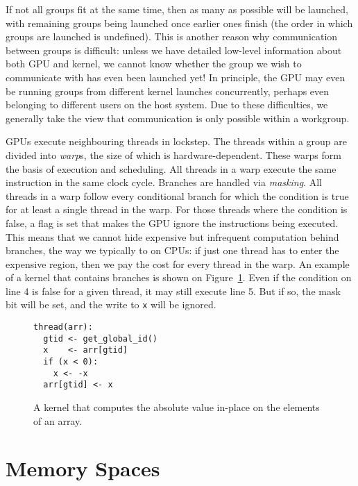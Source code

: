 If not all groups fit at the same time, then as many as possible will
be launched, with remaining groups being launched once earlier ones
finish (the order in which groups are launched is undefined).  This is
another reason why communication between groups is difficult: unless
we have detailed low-level information about both GPU and kernel, we
cannot know whether the group we wish to communicate with has even
been launched yet!  In principle, the GPU may even be running groups
from different kernel launches concurrently, perhaps even belonging to
different users on the host system.  Due to these difficulties, we
generally take the view that communication is only possible within a
workgroup.

GPUs execute neighbouring threads in lockstep.  The threads within a
group are divided into \textit{warp}s, the size of which is
hardware-dependent.  These warps form the basis of execution and
scheduling.  All threads in a warp execute the same instruction in the
same clock cycle.  Branches are handled via \textit{masking}.  All
threads in a warp follow every conditional branch for which the
condition is true for at least a single thread in the warp.  For those
threads where the condition is false, a flag is set that makes the GPU
ignore the instructions being executed.  This means that we cannot
hide expensive but infrequent computation behind branches, the way we
typically to on CPUs: if just one thread has to enter the expensive
region, then we pay the cost for every thread in the warp.  An example
of a kernel that contains branches is shown on
Figure~\ref{fig:gpu-branch}.  Even if the condition on line 4 is false
for a given thread, it may still execute line 5.  But if so, the mask
bit will be set, and the write to \texttt{x} will be ignored.

\begin{figure}
  \centering

\begin{lstlisting}[language={}]
thread(arr):
  gtid <- get_global_id()
  x    <- arr[gtid]
  if (x < 0):
    x <- -x
  arr[gtid] <- x
\end{lstlisting}

  \caption{A kernel that computes the absolute value in-place on the elements of an array.}
  \label{fig:gpu-branch}
\end{figure}

\section{Memory Spaces}
\label{sec:gpu-memory-spaces}

